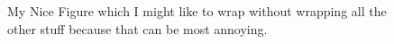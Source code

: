 

\begin{figure}[htbp] 
	\centering
 	\caption{My Nice Figure which I might like to wrap without wrapping all the other stuff because that can be most annoying.}
	\label{fig:myfigure}
\end{figure}

